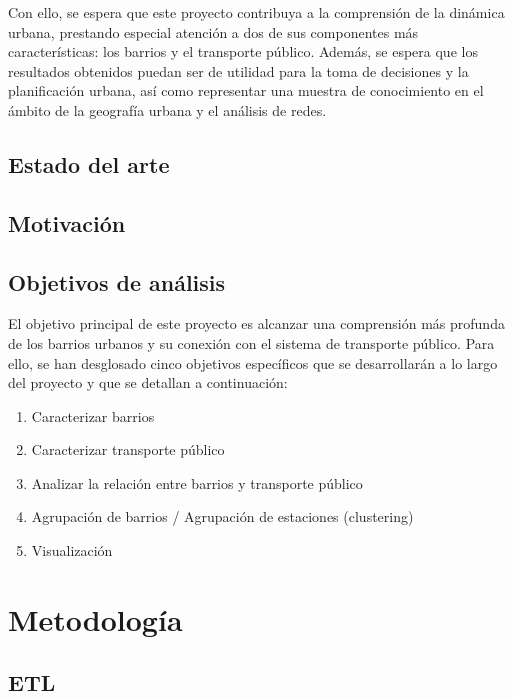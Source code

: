 \documentclass[
  10pt,
]{article}
\providecommand{\tightlist}{%
  \setlength{\itemsep}{0pt}\setlength{\parskip}{0pt}}
\begin{document}
Con ello, se espera que este proyecto contribuya a la comprensión de la
dinámica urbana, prestando especial atención a dos de sus componentes
más características: los barrios y el transporte público. Además, se
espera que los resultados obtenidos puedan ser de utilidad para la toma
de decisiones y la planificación urbana, así como representar una
muestra de conocimiento en el ámbito de la geografía urbana y el
análisis de redes.

\hypertarget{estado-del-arte}{%
\subsection{Estado del arte}\label{estado-del-arte}}

\hypertarget{motivaciuxf3n}{%
\subsection{Motivación}\label{motivaciuxf3n}}

\hypertarget{objetivos-de-anuxe1lisis}{%
\subsection{Objetivos de análisis}\label{objetivos-de-anuxe1lisis}}

El objetivo principal de este proyecto es alcanzar una comprensión más
profunda de los barrios urbanos y su conexión con el sistema de
transporte público. Para ello, se han desglosado cinco objetivos
específicos que se desarrollarán a lo largo del proyecto y que se
detallan a continuación:

\begin{enumerate}
\def\labelenumi{\arabic{enumi}.}
\tightlist
\item
  Caracterizar barrios
\item
  Caracterizar transporte público
\item
  Analizar la relación entre barrios y transporte público
\item
  Agrupación de barrios / Agrupación de estaciones (clustering)
\item
  Visualización
\end{enumerate}

\hypertarget{metodologuxeda}{%
\section{Metodología}\label{metodologuxeda}}

\hypertarget{etl}{%
\subsection{ETL}\label{etl}}
\end{document}
